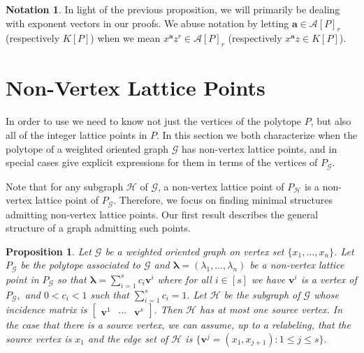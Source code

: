 \documentclass [12pt,a4paper,reqno]{amsart}
\theoremstyle{plain}
\newtheorem{Proposition}[Theorem]{Proposition}
\theoremstyle{definition}
\newtheorem{Assumptions and Discussion}[Theorem]{Assumptions and Discussion}
\newtheorem{Notation}[Theorem]{Notation}
\theoremstyle{remark}
\newcommand\bfa{\mathbf{a}}
\newcommand\bfv{\mathbf{v}}
\newcommand\calA{\mathcal{A}}
\newcommand\calG{\mathcal{G}}
\newcommand\calH{\mathcal{H}}
\begin{document}
\begin{Notation}
In light of the previous proposition, we will primarily be dealing with exponent vectors in our proofs. We abuse notation by letting $\bfa\in\calA[P]_r$ (respectively $K[P]$) when we mean $x^\bfa z^r\in\calA[P]_r$ (respectively $x^\bfa z \in K[P]$).
\end{Notation}



\section{Non-Vertex Lattice Points}\label{Sec:NVP}


In order to use  we need to know not just the vertices of the polytope $P$, but also all of the integer lattice points in $P$. In this section we both characterize when the polytope of a weighted oriented graph $\calG$ has non-vertex lattice points, and in special cases give explicit expressions for them in terms of the vertices of $P_\calG$. 

Note that for any subgraph $\calH$ of $\calG$, a non-vertex lattice point of $P_\calH$ is a non-vertex lattice point of $P_\calG$. Therefore, we focus on finding minimal structures admitting non-vertex lattice points. Our first result describes the general structure of a graph admitting such points.  


\begin{Proposition}
      \label{claw}Let $\calG$ be a weighted oriented graph on vertex set $\{x_1, \dots, x_n\}$.  Let $P_\calG$ be the polytope associated to $\calG$ and $\boldsymbol{\lambda}=(\lambda_1,\ldots,\lambda_n)$ be a non-vertex lattice point in $P_\calG$ 
      so that $\boldsymbol{\lambda}=\sum_{i=1}^sc_i\mathbf{v}^i$ where for all $i\in[s]$ we have $\bfv^i$ is a vertex of $P_\calG,$ and $0<c_i<1$ such that $\sum_{i=1}^{s}c_i=1.$ Let $\calH$ be the subgraph of $\calG$ whose incidence matrix is $\begin{bmatrix}\bfv^1&\cdots&\bfv^s\end{bmatrix}.$ Then $\calH$ has at most one source vertex. In the case that there is a source vertex, we can assume, up to a relabeling, that the source vertex is $x_1$ and the edge set of $\calH$ is $\{\bfv^j=(x_1,x_{j+1}):1\leq j\leq s\}.$ 
\end{Proposition}
  
\end{document}
